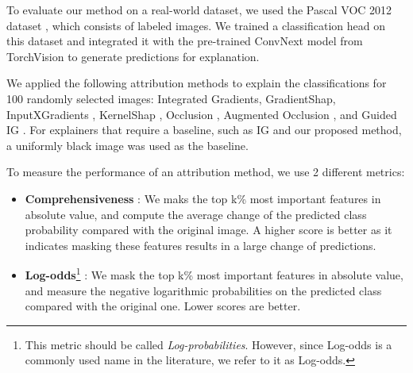 To evaluate our method on a real-world dataset, we used the Pascal VOC 2012 dataset \citep{pascal-voc-2012}, which consists of labeled images. We trained a classification head on this dataset and integrated it with the pre-trained ConvNext model \citep{liu2022convnet} from TorchVision to generate predictions for explanation.

We applied the following attribution methods to explain the classifications for 100 randomly selected images: Integrated Gradients, GradientShap, InputXGradients \citep{shrikumar2016not}, KernelShap \citep{lundberg2017unified}, Occlusion \citep{zeiler2014visualizing}, Augmented Occlusion \citep{tonekaboni2020went}, and Guided IG \citep{kapishnikov2021guided}.
For explainers that require a baseline, such as IG and our proposed method, a uniformly black image was used as the baseline.

To measure the performance of an attribution method, we use 2 different metrics:

\begin{itemize}
    \item \textbf{Comprehensiveness} \citep{deyoung2019eraser}: We maks the top k\% most important features in absolute value, and compute the average change of the predicted class probability compared with the original image. A higher score is better as it indicates masking these features results in a large change of predictions.

    \item \textbf{Log-odds}\footnote{This metric should be called \emph{Log-probabilities}. However, since Log-odds is a commonly used name in the literature, we refer to it as Log-odds.} \citep{shrikumar2017learning}: We mask the top k\% most important features in absolute value, and measure the negative logarithmic probabilities on the predicted class compared with the original one. Lower scores are better.
\end{itemize}

